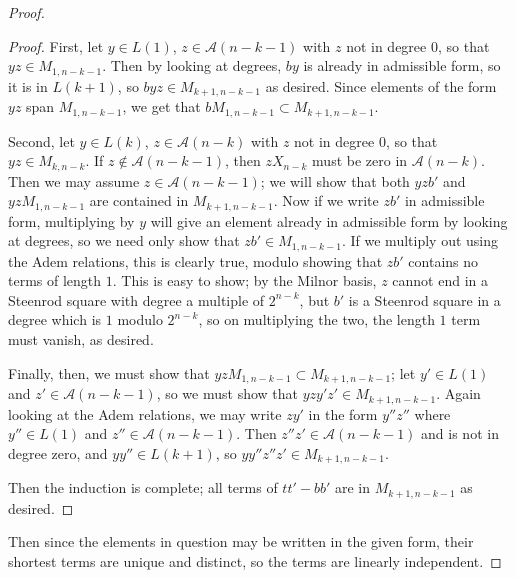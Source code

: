 \documentclass{article}
\newcommand{\A}{\mathcal{A}}
\begin{document}
\begin{proof}
\begin{proof}
    First, let $y\in L(1)$, $z\in \A(n-k-1)$ with $z$ not in degree $0$, so that $yz\in M_{1,n-k-1}$.  Then by looking at degrees, $by$ is already in admissible form, so it is in $L(k+1)$, so $byz\in M_{k+1,n-k-1}$ as desired.  Since elements of the form $yz$ span $M_{1,n-k-1}$, we get that $bM_{1,n-k-1}\subset M_{k+1,n-k-1}$.

    Second, let $y\in L(k)$, $z\in \A(n-k)$ with $z$ not in degree $0$, so that $yz\in M_{k,n-k}$.  If $z\not\in\A(n-k-1)$, then $zX_{n-k}$ must be zero in $\A(n-k)$.  Then we may assume $z\in\A(n-k-1)$; we will show that both $yzb'$ and $yzM_{1,n-k-1}$ are contained in $M_{k+1,n-k-1}$.  Now if we write $zb'$ in admissible form, multiplying by $y$ will give an element already in admissible form by looking at degrees, so we need only show that $zb'\in M_{1,n-k-1}$.  If we multiply out using the Adem relations, this is clearly true, modulo showing that $zb'$ contains no terms of length $1$.  This is easy to show; by the Milnor basis, $z$ cannot end in a Steenrod square with degree a multiple of $2^{n-k}$, but $b'$ is a Steenrod square in a degree which is $1$ modulo $2^{n-k}$, so on multiplying the two, the length $1$ term must vanish, as desired.

    Finally, then, we must show that $yzM_{1,n-k-1}\subset M_{k+1,n-k-1}$; let $y'\in L(1)$ and $z'\in\A(n-k-1)$, so we must show that $yzy'z'\in M_{k+1,n-k-1}$.  Again looking at the Adem relations, we may write $zy'$ in the form $y''z''$ where $y''\in L(1)$ and $z''\in\A(n-k-1)$.  Then $z''z'\in \A(n-k-1)$ and is not in degree zero, and $yy''\in L(k+1)$, so $yy''z''z'\in M_{k+1,n-k-1}$.

    Then the induction is complete; all terms of $tt'-bb'$ are in $M_{k+1,n-k-1}$ as desired.
    \end{proof}

    Then since the elements in question may be written in the given form, their shortest terms are unique and distinct, so the terms are linearly independent.
  \end{proof}
\end{document}
